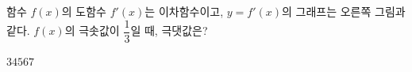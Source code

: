 \noindent\begin{minipage}[t]{0.58\linewidth}\vspace{0pt}\raggedright 함수 $f(x)$의 도함수 $f'(x)$는 이차함수이고, $y=f'(x)$의 그래프는 오른쪽 그림과 같다. $f(x)$의 극솟값이 $\dfrac{1}{3}$일 때, 극댓값은?\end{minipage}\hfill\begin{minipage}[t]{0.4\linewidth}\vspace{0pt}\centering \resizebox{\ifdim\width>\linewidth\linewidth\else\width\fi}{!}{}\end{minipage}\par
\begin{choicesii}{$3$}{$4$}{$5$}{$6$}{$7$}\end{choicesii}
